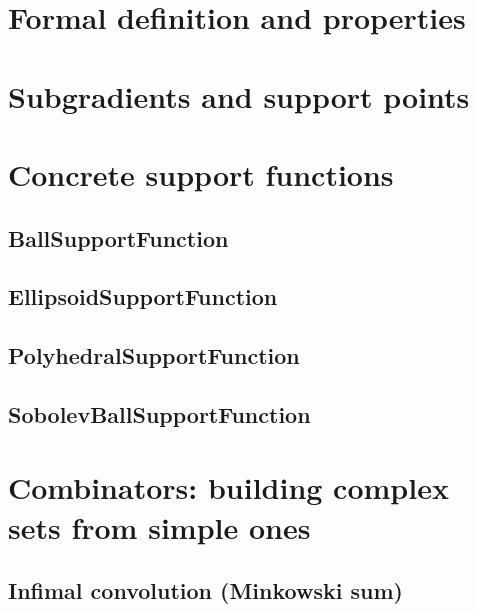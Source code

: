 \documentclass[11pt,twoside,openright]{book}
\theoremstyle{plain}
\theoremstyle{definition}
\theoremstyle{remark}
\begin{document}
\section{Formal definition and properties}
\label{sec:support-definition}

\section{Subgradients and support points}
\label{sec:subgradients}

\section{Concrete support functions}
\label{sec:concrete-support}

\subsection{BallSupportFunction}
\label{ssec:ball-support}

\subsection{EllipsoidSupportFunction}
\label{ssec:ellipsoid-support}

\subsection{PolyhedralSupportFunction}
\label{ssec:polyhedral-support}

\subsection{SobolevBallSupportFunction}
\label{ssec:sobolev-support}

\section{Combinators: building complex sets from simple ones}
\label{sec:support-combinators}

\subsection{Infimal convolution (Minkowski sum)}
\label{ssec:infimal-convolution}
\end{document}
